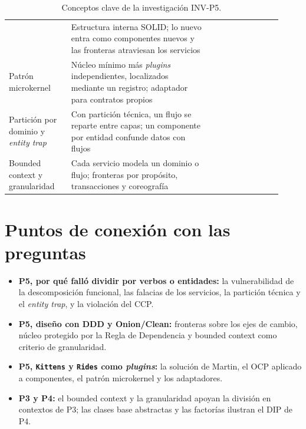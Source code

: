 \begin{table}[htbp]
\begin{tabular}{@{}p{0.21\linewidth}p{0.47\linewidth}p{0.24\linewidth}@{}}
      & \raggedright Estructura interna SOLID; lo nuevo entra como componentes nuevos y las
        fronteras atraviesan los servicios
      & \raggedright \textcite[245--247]{martin2017} \tabularnewline
    \raggedright Patrón microkernel
      & \raggedright Núcleo mínimo más \emph{plugins} independientes, localizados mediante
        un registro; adaptador para contratos propios
      & \raggedright \textcite[21--23]{richards2015} \tabularnewline
    \raggedright Partición por dominio y \emph{entity trap}
      & \raggedright Con partición técnica, un flujo se reparte entre capas; un componente
        por entidad confunde datos con flujos
      & \raggedright \textcite[cap.~8]{richardsford2020} \tabularnewline
    \raggedright Bounded context y granularidad
      & \raggedright Cada servicio modela un dominio o flujo; fronteras por propósito,
        transacciones y coreografía
      & \raggedright \textcite[caps.~7 y 17]{richardsford2020} \tabularnewline
    \bottomrule
  \end{tabular}
  \caption{Conceptos clave de la investigación INV-P5.}
  \label{tab:inv-p5-conceptos}
\end{table}

\section{Puntos de conexión con las preguntas}

\begin{itemize}
  \item \textbf{P5, por qué falló dividir por verbos o entidades:} la vulnerabilidad de la
        descomposición funcional, las falacias de los servicios, la partición técnica y el
        \emph{entity trap}, y la violación del CCP.
  \item \textbf{P5, diseño con DDD y Onion/Clean:} fronteras sobre los ejes de cambio,
        núcleo protegido por la Regla de Dependencia y bounded context como criterio de
        granularidad.
  \item \textbf{P5, \texttt{Kittens} y \texttt{Rides} como \emph{plugins}:} la solución
        de Martin, el OCP aplicado a componentes, el patrón microkernel y los adaptadores.
  \item \textbf{P3 y P4:} el bounded context y la granularidad apoyan la división en
        contextos de P3; las clases base abstractas y las factorías ilustran el DIP de P4.
\end{itemize}


